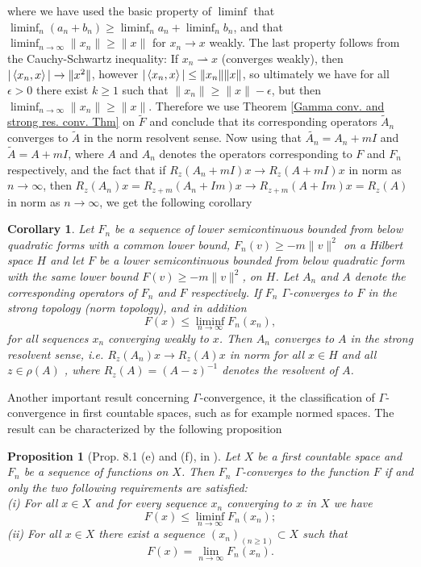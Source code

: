 \documentclass[a4paper,11pt]{article}
\newcommand{\ie}{\emph{i.e.} }
\newtheorem{proposition}{Proposition}
\newtheorem{corollary}{Corollary}
\numberwithin{equation}{section}
\begin{document}
where we have used the basic property of $ \liminf $ that $ \liminf_n(a_n+b_n)\geq\liminf_na_n+\liminf_n b_n $, and that $ \liminf_{n\to\infty}\|x_n\|\geq\|x\| $ for $ x_n\to x $ weakly. The last property follows from the  Cauchy-Schwartz inequality: If $ x_n \rightharpoonup x$ (converges weakly), then $ |\braket{x_n,x}|\to\|x^2\| $, however $ |\braket{x_n,x}|\leq\|x_n\|\|x\| $, so ultimately we have for all $ \epsilon>0 $ there exist $ k\geq1 $ such that $ \|x_n\|\geq\|x\|-\epsilon $, but then $ \liminf_{n\to\infty}\|x_n\|\geq\|x\| $. Therefore we use Theorem \ref{Gamma conv. and strong res. conv. Thm} on $ \tilde{F} $ and conclude that its corresponding operators $ \tilde{A}_n $ converges to $ \tilde{A} $ in the norm resolvent sense. Now using that $ \tilde{A_n}=A_n+mI $ and $ \tilde{A}=A+mI $, where $ A $ and $ A_n $ denotes the operators corresponding to $ F $ and $ F_n $ respectively, and the fact that if $ R_z(A_n+mI)x\to R_z(A+mI)x $ in norm as $ n\to\infty $, then $ R_z(A_n)x=R_{z+m}(A_n+Im)x\to R_{z+m}(A+Im)x=R_z(A) $ in norm as $ n\to\infty $, we get the following corollary
\begin{corollary}\label{Gamma conv. and strong res. conv. Col}
	Let $ F_n $ be a sequence of lower semicontinuous bounded from below quadratic forms with a common lower bound, $ F_n(v)\geq-m\|v\|^2 $ on a Hilbert space $ H $ and let $ F $ be a lower semicontinuous bounded from below quadratic form with the same lower bound $ F(v)\geq-m\|v\|^2 $, on $ H $. Let $ A_n $ and $ A $ denote the corresponding operators of $ F_n $ and $ F $ respectively. If $ F_n $ $ \Gamma $-converges to $ F $ in the strong topology (norm topology), and in addition \begin{equation}
	F(x)\leq\liminf_{n\to\infty}F_n(x_n),
	\end{equation}
	for all sequences $ x_n $ converging weakly to $ x $. Then $ A_n $ converges to $ A $ in the strong resolvent sense, \ie $ R_z(A_n)x\to R_z(A)x $ in norm for all $ x\in H $ and all $ z\in\rho(A)$ , where $ R_z(A)=(A-z)^{-1} $ denotes the resolvent of $ A $.
\end{corollary}
Another important result concerning $ \Gamma $-convergence, it the classification of $ \Gamma $-convergence in first countable spaces, such as for example normed spaces. The result can be characterized by the following proposition
\begin{proposition}[Prop. 8.1 (e) and (f), in \cite{maso1993introduction}]\label{Gamma conv. first countable. prop}
	Let $ X $ be a first countable space and $ F_n $ be a sequence of functions on $ X $. Then $ F_n $ $ \Gamma $-converges to the function $ F $ if and only the two following requirements are satisfied:\\
	(i) For all $ x\in X $ and for every sequence $ x_n $ converging to $ x $ in $ X $ we have \begin{equation}
	F(x)\leq\liminf_{n\to\infty}F_n(x_n);
	\end{equation}
	(ii) For all $ x\in X $ there exist a sequence $ (x_n)_(n\geq1)\subset X $ such that \begin{equation}
	F(x)=\lim\limits_{n\to\infty}F_n(x_n).
	\end{equation}
\end{proposition}
\end{document}
